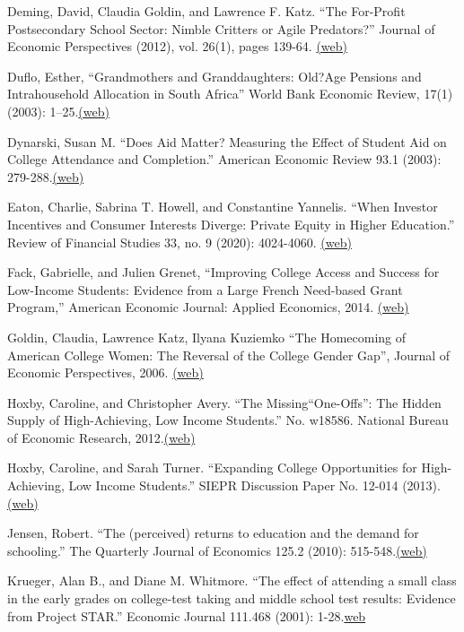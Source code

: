 \documentclass[landscape]{slides}
\begin{document}
\begin{slide}
{Deming, David, Claudia Goldin, and Lawrence F. Katz. ``The For-Profit Postsecondary School Sector: Nimble Critters or Agile Predators?'' Journal of Economic Perspectives (2012), vol. 26(1), pages 139-64. \href{http://www.nber.org/papers/w17710.pdf}{(web)}

Duflo, Esther, ``Grandmothers and Granddaughters: Old?Age Pensions and Intrahousehold Allocation in South Africa'' World Bank Economic Review, 17(1) (2003): 1--25.\href{http://elsa.berkeley.edu/~saez/course131/duflo03.pdf}{(web)}

Dynarski, Susan M. ``Does Aid Matter? Measuring the Effect of Student Aid on College Attendance and Completion.'' American Economic Review 93.1 (2003): 279-288.\href{http://www.jstor.org/stable/pdfplus/3132174.pdf}{(web)}

Eaton, Charlie, Sabrina T. Howell, and Constantine Yannelis. ``When Investor Incentives and Consumer Interests Diverge: Private Equity in Higher Education.'' Review of Financial Studies 33, no. 9 (2020): 4024-4060.
\href{http://elsa.berkeley.edu/~saez/course131/Eatonetal2020privateequity.pdf}{(web)}

Fack, Gabrielle, and Julien Grenet, ``Improving College Access and Success for Low-Income Students: Evidence from a Large French Need-based Grant Program,'' American Economic Journal: Applied Economics, 2014.
\href{http://elsa.berkeley.edu/~saez/course131/fack-grenet.pdf}{(web)}

Goldin, Claudia,  Lawrence Katz, Ilyana Kuziemko ``The Homecoming of American College Women: The Reversal of the College Gender Gap'', Journal of Economic Perspectives, 2006.
\href{http://elsa.berkeley.edu/~saez/course131/gkk_jep.pdf}{(web)}

Hoxby, Caroline, and Christopher Avery. ``The Missing``One-Offs'': The Hidden Supply of High-Achieving, Low Income Students.'' No. w18586. National Bureau of Economic Research, 2012.\href{http://www.nber.org/papers/w18586.pdf}{(web)}

Hoxby, Caroline, and Sarah Turner. ``Expanding College Opportunities for High-Achieving, Low Income Students.'' SIEPR Discussion Paper No. 12-014 (2013).\href{http://elsa.berkeley.edu/~saez/course131/Hoxby-Turner13.pdf}{(web)}

Jensen, Robert. ``The (perceived) returns to education and the demand for schooling.'' The Quarterly Journal of Economics 125.2 (2010): 515-548.\href{http://elsa.berkeley.edu/~saez/course131/Jensen10.pdf}{(web)}

Krueger, Alan B., and Diane M. Whitmore. ``The effect of attending a small class in the early grades on college-test taking and middle school test results: Evidence from Project STAR.'' Economic Journal 111.468 (2001): 1-28.\href{http://elsa.berkeley.edu/~saez/course131/Krueger-Whitmore01.pdf}{web}

}
\end{slide}
\end{document}

